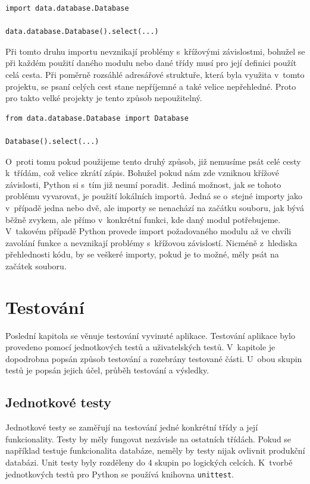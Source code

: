 \documentclass[thesis=B,czech]{resources/FITthesis}[2012/06/26]
\begin{document}
\begin{listing}[htbp]
\begin{verbatim}
import data.database.Database

data.database.Database().select(...)
\end{verbatim}
\end{listing}

Při tomto druhu importu nevznikají problémy s~křížovými závislostmi, bohužel se při každém použití daného modulu nebo dané třídy musí pro její definici použít celá cesta. Při poměrně rozsáhlé adresářové struktuře, která byla využita v~tomto projektu, se psaní celých cest stane nepříjemné a také velice nepřehledné. Proto pro takto velké projekty je tento způsob nepoužitelný.

\begin{listing}[htbp]
\begin{verbatim}
from data.database.Database import Database

Database().select(...)
\end{verbatim}
\end{listing}
O~proti tomu pokud použijeme tento druhý způsob, již nemusíme psát celé cesty k~třídám, což velice zkrátí zápis. Bohužel pokud nám zde vzniknou křížové závislosti, Python si s~tím již neumí poradit. Jediná možnost, jak se tohoto problému vyvarovat, je použití lokálních importů. Jedná se o~stejné importy jako v~případě jedna nebo dvě, ale importy se nenachází na začátku souboru, jak bývá běžně zvykem, ale přímo v~konkrétní funkci, kde daný modul potřebujeme. V~takovém případě Python provede import požadovaného modulu až ve chvíli zavolání funkce a nevznikají problémy s~křížovou závislostí. Nicméně z~hlediska přehlednosti kódu, by se veškeré importy, pokud je to možné, měly psát na začátek souboru. 



\chapter{Testování}
Poslední kapitola se věnuje testování vyvinuté aplikace. Testování aplikace bylo provedeno pomocí jednotkových testů a uživatelských testů. V~kapitole je dopodrobna popsán způsob testování a rozebrány testované části. U~obou skupin testů je popsán jejich účel, průběh testování a výsledky.
	\section{Jednotkové testy}
Jednotkové testy se zaměřují na testování jedné konkrétní třídy a její funkcionality. Testy by měly fungovat nezávisle na ostatních třídách. Pokud se například testuje funkcionalita databáze, neměly by testy nijak ovlivnit produkční databázi. Unit testy byly rozděleny do 4 skupin po logických celcích. K~tvorbě jednotkových testů pro Python se používá knihovna \texttt{unittest}.
\end{document}
